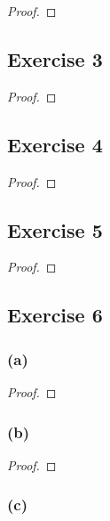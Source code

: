 \documentclass[14pt]{extarticle}
\begin{document}
\begin{proof}

\end{proof}

\subsection{Exercise 3}

\begin{proof}

\end{proof}

\subsection{Exercise 4}

\begin{proof}

\end{proof}

\subsection{Exercise 5}

\begin{proof}

\end{proof}

\subsection{Exercise 6}

\subsubsection{(a)}

\begin{proof}

\end{proof}

\subsubsection{(b)}

\begin{proof}

\end{proof}

\subsubsection{(c)}
\end{document}
